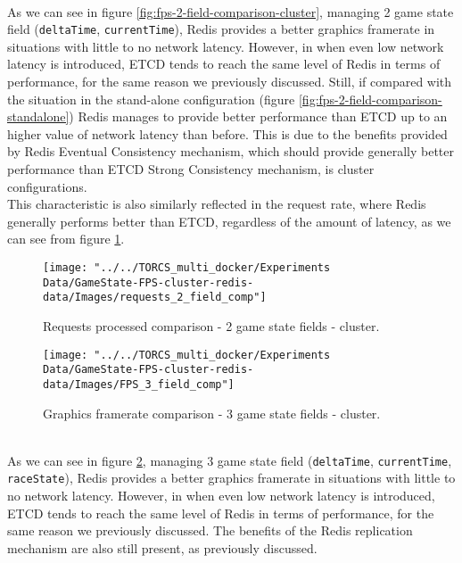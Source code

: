 \\ As we can see in figure \ref{fig:fps-2-field-comparison-cluster}, managing 2 game state field (\texttt{deltaTime}, \texttt{currentTime}), Redis provides a better graphics framerate in situations with little to no network latency. However, in when even low network latency is introduced, ETCD tends to reach the same level of Redis in terms of performance, for the same reason we previously discussed. Still, if compared with the situation in the stand-alone configuration (figure \ref{fig:fps-2-field-comparison-standalone}) Redis manages to provide better performance than ETCD up to an higher value of network latency than before. This is due to the benefits provided by Redis Eventual Consistency mechanism, which should provide generally better performance than ETCD Strong Consistency mechanism, is cluster configurations. \\
This characteristic is also similarly reflected in the request rate, where Redis generally performs better than ETCD, regardless of the amount of latency, as we can see from figure \ref{fig:requests-2-field-comparison-cluster}. \\
\begin{figure}[h!]
	\centering
	\texttt{[image: "../../TORCS\_multi\_docker/Experiments Data/GameState-FPS-cluster-redis-data/Images/requests\_2\_field\_comp"]}
	\caption[Requests processed comparison - 2 game state fields - cluster]{Requests processed comparison - 2 game state fields - cluster.}
	\label{fig:requests-2-field-comparison-cluster}
\end{figure}
\begin{figure}[h!]
	\centering
	\texttt{[image: "../../TORCS\_multi\_docker/Experiments Data/GameState-FPS-cluster-redis-data/Images/FPS\_3\_field\_comp"]}
	\caption[Graphics framerate comparison - 3 game state fields - cluster]{Graphics framerate comparison - 3 game state fields - cluster.}
	\label{fig:fps-3-field-comparison-cluster}
\end{figure}
\\ As we can see in figure \ref{fig:fps-3-field-comparison-cluster}, managing 3 game state field (\texttt{deltaTime}, \texttt{currentTime}, \texttt{raceState}), Redis provides a better graphics framerate in situations with little to no network latency. However, in when even low network latency is introduced, ETCD tends to reach the same level of Redis in terms of performance, for the same reason we previously discussed. The benefits of the Redis replication mechanism are also still present, as previously discussed. \\
